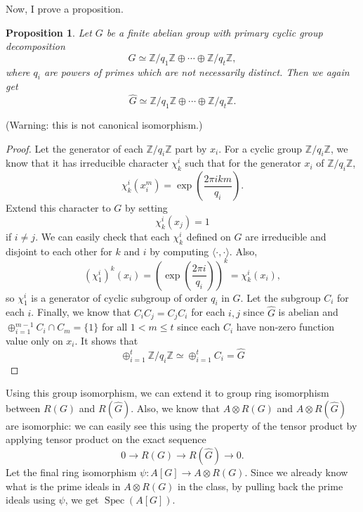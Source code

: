 \documentclass[a4paper, 12pt]{article}
\theoremstyle{Mydefinition}
\theoremstyle{Mytheorem}
\newtheorem{proposition}[statement]{Proposition}
\DeclareMathOperator{\Spec}{Spec}
\begin{document}
Now, I prove a proposition.
\begin{proposition}
Let $G$ be a finite abelian group with primary cyclic group decomposition
\begin{equation}
    G\simeq \mathbb{Z}/q_1\mathbb{Z}\oplus \cdots \oplus \mathbb{Z}/q_t\mathbb{Z},
\end{equation}
where $q_i$ are powers of primes which are not necessarily distinct. Then we again get
\begin{equation}
    \hat{G}\simeq \mathbb{Z}/q_1\mathbb{Z}\oplus \cdots \oplus \mathbb{Z}/q_t\mathbb{Z}.
\end{equation}
\end{proposition}
(Warning: this is not canonical isomorphism.)
\begin{proof}
Let the generator of each $\mathbb{Z}/q_i\mathbb{Z}$ part by $x_i$. For a cyclic group $\mathbb{Z}/q_i\mathbb{Z}$, we know that it has irreducible character $\chi^i_k$ such that for the generator $x_i$ of $\mathbb{Z}/q_i\mathbb{Z}$,
\begin{equation}
    \chi^i_k(x_i^m) = \exp(\frac{2\pi i km}{q_i}).
\end{equation}
Extend this character to $G$ by setting
\begin{equation}
    \chi_k^i(x_j) = 1
\end{equation}
if $i\neq j$. We can easily check that each $\chi_k^i$ defined on $G$ are irreducible and disjoint to each other for $k$ and $i$ by computing $\langle \cdot, \cdot \rangle$. Also,
\begin{equation}
    (\chi_1^i)^{k}(x_i) = \left(\exp(\frac{2\pi i}{q_i})\right)^{k} = \chi_k^i(x_i),
\end{equation}
so $\chi_1^i$ is a generator of cyclic subgroup of order $q_i$ in $G$. Let the subgroup $C_i$ for each $i$. Finally, we know that $C_iC_j = C_jC_i$ for each $i,j$ since $\hat{G}$ is abelian and $\oplus_{i=1}^{m-1} C_i\cap C_m = \{1\}$ for all $1<m\leq t$ since each $C_i$ have non-zero function value only on $x_i$. It shows that 
\begin{equation}
    \oplus_{i=1}^t \mathbb{Z}/q_i\mathbb{Z} \simeq \oplus_{i=1}^t C_i = \hat{G}
\end{equation}
\end{proof}

Using this group isomorphism, we can extend it to group ring isomorphism between $R(G)$ and $R(\hat{G})$. Also, we know that $A\otimes R(G)$ and $A\otimes R(\hat{G})$ are isomorphic: we can easily see this using the property of the tensor product by applying tensor product on the exact sequence
\begin{equation}
    0\rightarrow R(G)\rightarrow R(\hat{G})\rightarrow 0.
\end{equation}
Let the final ring isomorphism $\psi:A[G]\rightarrow A\otimes R(G)$. Since we already know what is the prime ideals in $A\otimes R(G)$ in the class, by pulling back the prime ideals using $\psi$, we get $\Spec(A[G])$.\\
\end{document}
